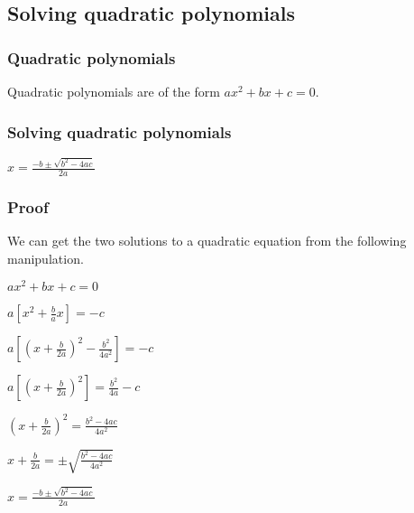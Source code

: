 
\subsection{Solving quadratic polynomials}

\subsubsection{Quadratic polynomials}

Quadratic polynomials are of the form \(ax^2+bx+c=0\).

\subsubsection{Solving quadratic polynomials}

\(x=\frac{-b\pm \sqrt {b^2-4ac}}{2a}\)

\subsubsection{Proof}

We can get the two solutions to a quadratic equation from the following manipulation.

\(ax^2+bx+c=0\)

\(a[x^2+\frac{b}{a}x]=-c\)

\(a[(x+\frac{b}{2a})^2-\frac{b^2}{4a^2}]=-c\)

\(a[(x+\frac{b}{2a})^2]=\frac{b^2}{4a}-c\)

\((x+\frac{b}{2a})^2=\frac{b^2-4ac}{4a^2}\)

\(x+\frac{b}{2a}=\pm \sqrt {\frac{b^2-4ac}{4a^2}}\)

\(x=\frac{-b\pm \sqrt {b^2-4ac}}{2a}\)

